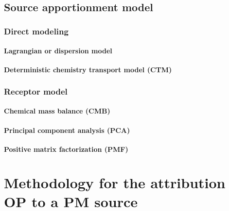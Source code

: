 \documentclass[a4paper,12pt]{memoir}
\begin{document}
\chapter{Source apportionment model}%
\label{prt:source_apportionment_model}

\section{Direct modeling}%
\label{sec:direct_modeling}

\subsection{Lagrangian or dispersion model}%
\label{sub:lagrangian_or_dispersion_model}

\subsection{Deterministic chemistry transport model (CTM)}%
\label{sub:deterministic_chemistry_transport_model_ctm_}

\section{Receptor model}%
\label{sec:receptor_model}

\subsection{Chemical mass balance (CMB)}%
\label{sub:chemical_mass_balance_cmb_}

\subsection{Principal component analysis (PCA)}%
\label{sub:principal_component_analysis_pca_}

\subsection{Positive matrix factorization (PMF)}%
\label{sub:positive_matrix_factorization_pmf_}





\part{Methodology for the attribution OP to a PM source}%
\label{cha:methodology_for_the_attribution_of_intrisinc_op_to_a_pm_source}
\end{document}
